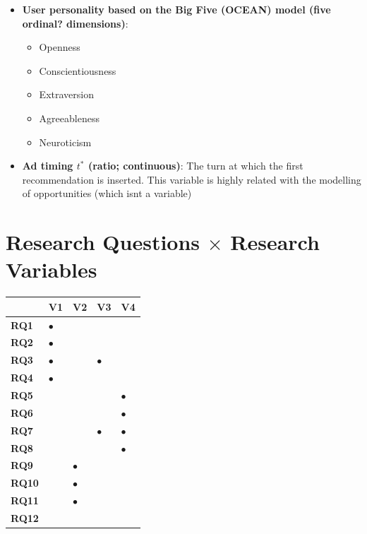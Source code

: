 \documentclass{article}
\begin{document}
\begin{itemize}
    \item \textbf{User personality based on the Big Five (OCEAN) model (five ordinal? dimensions)}: 
    \begin{itemize}
        \item Openness
        \item Conscientiousness
        \item Extraversion
        \item Agreeableness
        \item Neuroticism
    \end{itemize}
    
    \item \textbf{Ad timing $t^*$ (ratio; continuous)}: The turn at which the first recommendation is inserted. This variable is highly related with the modelling of opportunities (which isnt a variable)
\end{itemize}

\section{Research Questions $\times$ Research Variables}

\begin{center}
\begin{tabular}{
    >{\centering\arraybackslash}m{1.2cm}
    |>{\centering\arraybackslash}m{1.2cm}
    |>{\centering\arraybackslash}m{1.2cm}
    |>{\centering\arraybackslash}m{1.2cm}
    |>{\centering\arraybackslash}m{1.2cm}|
}
\multicolumn{1}{c}{} 
& \textbf{V1} & \textbf{V2} & \textbf{V3} & \textbf{V4} \\ \cline{2-5}

\textbf{RQ1}  & $\bullet$ & & & \\ \hline
\textbf{RQ2}  & $\bullet$ & & & \\ \hline
\textbf{RQ3}  & $\bullet$ & & $\bullet$ & \\ \hline
\textbf{RQ4}  & $\bullet$ & & & \\ \hline
\textbf{RQ5}  & & & & $\bullet$ \\ \hline
\textbf{RQ6}  & & & & $\bullet$ \\ \hline
\textbf{RQ7}  & & & $\bullet$ & $\bullet$ \\ \hline
\textbf{RQ8}  & & & & $\bullet$ \\ \hline
\textbf{RQ9}  & & $\bullet$ & & \\ \hline
\textbf{RQ10} & & $\bullet$ & & \\ \hline
\textbf{RQ11} & & $\bullet$ & & \\ \hline
\textbf{RQ12} & & & & \\ \hline
\end{tabular}
\end{center}
\end{document}
